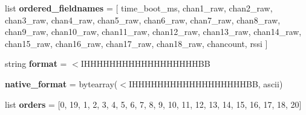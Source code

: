 \begin{DoxyCompactItemize}
list {\bfseries ordered\+\_\+fieldnames} = \mbox{[} \textquotesingle{}time\+\_\+boot\+\_\+ms\textquotesingle{}, \textquotesingle{}chan1\+\_\+raw\textquotesingle{}, \textquotesingle{}chan2\+\_\+raw\textquotesingle{}, \textquotesingle{}chan3\+\_\+raw\textquotesingle{}, \textquotesingle{}chan4\+\_\+raw\textquotesingle{}, \textquotesingle{}chan5\+\_\+raw\textquotesingle{}, \textquotesingle{}chan6\+\_\+raw\textquotesingle{}, \textquotesingle{}chan7\+\_\+raw\textquotesingle{}, \textquotesingle{}chan8\+\_\+raw\textquotesingle{}, \textquotesingle{}chan9\+\_\+raw\textquotesingle{}, \textquotesingle{}chan10\+\_\+raw\textquotesingle{}, \textquotesingle{}chan11\+\_\+raw\textquotesingle{}, \textquotesingle{}chan12\+\_\+raw\textquotesingle{}, \textquotesingle{}chan13\+\_\+raw\textquotesingle{}, \textquotesingle{}chan14\+\_\+raw\textquotesingle{}, \textquotesingle{}chan15\+\_\+raw\textquotesingle{}, \textquotesingle{}chan16\+\_\+raw\textquotesingle{}, \textquotesingle{}chan17\+\_\+raw\textquotesingle{}, \textquotesingle{}chan18\+\_\+raw\textquotesingle{}, \textquotesingle{}chancount\textquotesingle{}, \textquotesingle{}rssi\textquotesingle{} \mbox{]}
\item 
\mbox{\label{classpymavlink_1_1dialects_1_1v10_1_1MAVLink__rc__channels__message_a46a1f046b156f15a0b10f4a44ef27581}} 
string {\bfseries format} = \textquotesingle{}$<$I\+H\+H\+H\+H\+H\+H\+H\+H\+H\+H\+H\+H\+H\+H\+H\+H\+H\+H\+BB\textquotesingle{}
\item 
\mbox{\label{classpymavlink_1_1dialects_1_1v10_1_1MAVLink__rc__channels__message_a27618647d17f0eae260432cfb7eb18f1}} 
{\bfseries native\+\_\+format} = bytearray(\textquotesingle{}$<$I\+H\+H\+H\+H\+H\+H\+H\+H\+H\+H\+H\+H\+H\+H\+H\+H\+H\+H\+BB\textquotesingle{}, \textquotesingle{}ascii\textquotesingle{})
\item 
\mbox{\label{classpymavlink_1_1dialects_1_1v10_1_1MAVLink__rc__channels__message_a8b95928492090299d09bb1164110d3d3}} 
list {\bfseries orders} = \mbox{[}0, 19, 1, 2, 3, 4, 5, 6, 7, 8, 9, 10, 11, 12, 13, 14, 15, 16, 17, 18, 20\mbox{]}
\item 
\mbox{\label{classpymavlink_1_1dialects_1_1v10_1_1MAVLink__rc__channels__message_a2d3bfdbb6730da3c25a5a145575b6263}} 

\end{DoxyCompactItemize}
